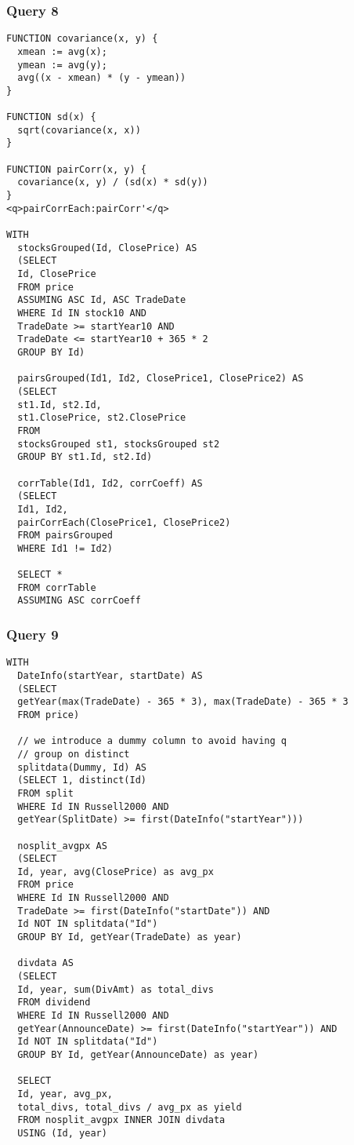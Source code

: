 \documentclass{acm_proc_article-sp}
\begin{document}
\subsubsection{Query 8}
\begin{lstlisting}
FUNCTION covariance(x, y) {
  xmean := avg(x);
  ymean := avg(y);
  avg((x - xmean) * (y - ymean))
}

FUNCTION sd(x) {
  sqrt(covariance(x, x))
}

FUNCTION pairCorr(x, y) {
  covariance(x, y) / (sd(x) * sd(y))
}
<q>pairCorrEach:pairCorr'</q>

WITH
  stocksGrouped(Id, ClosePrice) AS 
  (SELECT 
  Id, ClosePrice 
  FROM price 
  ASSUMING ASC Id, ASC TradeDate
  WHERE Id IN stock10 AND 
  TradeDate >= startYear10 AND
  TradeDate <= startYear10 + 365 * 2 
  GROUP BY Id)
  
  pairsGrouped(Id1, Id2, ClosePrice1, ClosePrice2) AS 
  (SELECT 
  st1.Id, st2.Id, 
  st1.ClosePrice, st2.ClosePrice 
  FROM 
  stocksGrouped st1, stocksGrouped st2 
  GROUP BY st1.Id, st2.Id)
  
  corrTable(Id1, Id2, corrCoeff) AS 
  (SELECT 
  Id1, Id2,
  pairCorrEach(ClosePrice1, ClosePrice2) 
  FROM pairsGrouped
  WHERE Id1 != Id2)
       
  SELECT * 
  FROM corrTable 
  ASSUMING ASC corrCoeff
\end{lstlisting}

\subsubsection{Query 9}
\begin{lstlisting}
WITH
  DateInfo(startYear, startDate) AS 
  (SELECT 
  getYear(max(TradeDate) - 365 * 3), max(TradeDate) - 365 * 3 
  FROM price)

  // we introduce a dummy column to avoid having q
  // group on distinct
  splitdata(Dummy, Id) AS 
  (SELECT 1, distinct(Id) 
  FROM split 
  WHERE Id IN Russell2000 AND
  getYear(SplitDate) >= first(DateInfo("startYear")))
    
  nosplit_avgpx AS 
  (SELECT 
  Id, year, avg(ClosePrice) as avg_px 
  FROM price 
  WHERE Id IN Russell2000 AND
  TradeDate >= first(DateInfo("startDate")) AND
  Id NOT IN splitdata("Id")
  GROUP BY Id, getYear(TradeDate) as year)
    
  divdata AS 
  (SELECT 
  Id, year, sum(DivAmt) as total_divs 
  FROM dividend 
  WHERE Id IN Russell2000 AND 
  getYear(AnnounceDate) >= first(DateInfo("startYear")) AND 
  Id NOT IN splitdata("Id")
  GROUP BY Id, getYear(AnnounceDate) as year)
    
  SELECT 
  Id, year, avg_px, 
  total_divs, total_divs / avg_px as yield
  FROM nosplit_avgpx INNER JOIN divdata 
  USING (Id, year)
\end{lstlisting}    
\end{document}
